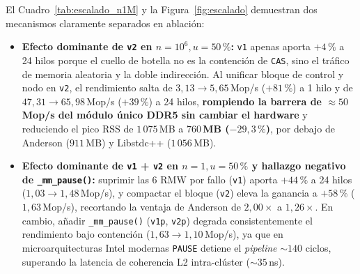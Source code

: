 \documentclass[11pt,a4paper]{article}
\begin{document}
El Cuadro~\ref{tab:escalado_n1M} y la Figura~\ref{fig:escalado} demuestran dos mecanismos claramente separados en ablación:
\begin{itemize}
  \item \textbf{Efecto dominante de \texttt{v2} en $n=10^6, u=50\,\%$:} \texttt{v1} apenas aporta $+4\,\%$ a 24 hilos porque el cuello de botella no es la contención de \texttt{CAS}, sino el tráfico de memoria aleatoria y la doble indirección. Al unificar bloque de control y nodo en \texttt{v2}, el rendimiento salta de $3{,}13 \to 5{,}65$\,Mop/s ($+81\,\%$) a 1 hilo y de $47{,}31 \to 65{,}98$\,Mop/s ($+39\,\%$) a 24 hilos, \textbf{rompiendo la barrera de $\approx 50$\,Mop/s del módulo único DDR5 sin cambiar el hardware} y reduciendo el pico RSS de $1\,075$\,MB a \textbf{$760$\,MB ($-29{,}3\,\%$)}, por debajo de Anderson ($911$\,MB) y Libstdc++ ($1\,056$\,MB).
  \item \textbf{Efecto dominante de \texttt{v1} + \texttt{v2} en $n=1, u=50\,\%$ y hallazgo negativo de \texttt{\_mm\_pause()}:} suprimir las 6 RMW por fallo (\texttt{v1}) aporta $+44\,\%$ a 24 hilos ($1{,}03 \to 1{,}48$\,Mop/s), y compactar el bloque (\texttt{v2}) eleva la ganancia a \textbf{$+58\,\%$} ($1{,}63$\,Mop/s), recortando la ventaja de Anderson de $2{,}00\times$ a $1{,}26\times$. En cambio, añadir \texttt{\_mm\_pause()} (\texttt{v1p}, \texttt{v2p}) degrada consistentemente el rendimiento bajo contención ($1{,}63 \to 1{,}10$\,Mop/s), ya que en microarquitecturas Intel modernas \texttt{PAUSE} detiene el \emph{pipeline} $\sim 140$ ciclos, superando la latencia de coherencia L2 intra-clúster ($\sim 35$\,ns).
\end{itemize}
\end{document}
